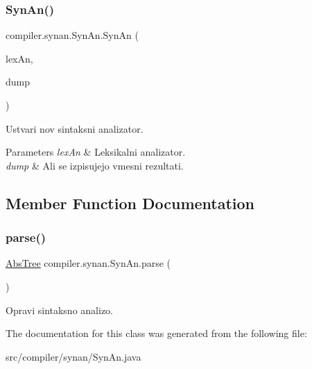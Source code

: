 \subsubsection{\texorpdfstring{Syn\+An()}{SynAn()}}
{\footnotesize\ttfamily compiler.\+synan.\+Syn\+An.\+Syn\+An (\begin{DoxyParamCaption}\item[{\hyperlink{classcompiler_1_1lexan_1_1_lex_an}{Lex\+An}}]{lex\+An,  }\item[{boolean}]{dump }\end{DoxyParamCaption})}

Ustvari nov sintaksni analizator.


\begin{DoxyParams}{Parameters}
{\em lex\+An} & Leksikalni analizator. \\
\hline
{\em dump} & Ali se izpisujejo vmesni rezultati. \\
\hline
\end{DoxyParams}


\subsection{Member Function Documentation}
\mbox{\label{classcompiler_1_1synan_1_1_syn_an_a26b06d720cf4157206e5ee3f91b0238c}} 
\subsubsection{\texorpdfstring{parse()}{parse()}}
{\footnotesize\ttfamily \hyperlink{classcompiler_1_1abstr_1_1tree_1_1_abs_tree}{Abs\+Tree} compiler.\+synan.\+Syn\+An.\+parse (\begin{DoxyParamCaption}{ }\end{DoxyParamCaption})}

Opravi sintaksno analizo. 

The documentation for this class was generated from the following file\+:\begin{DoxyCompactItemize}
\item 
src/compiler/synan/Syn\+An.\+java\end{DoxyCompactItemize}
